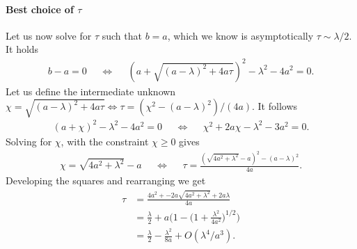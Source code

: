 \documentclass[11pt]{article}
\begin{document}
\paragraph{Best choice of $\tau$} Let us now solve for $\tau$ such that $b=a$, which we know is asymptotically $\tau\sim \lambda/2$. It holds
\begin{align*}
b-a = 0 &&\Leftrightarrow && (a+\sqrt{(a-\lambda)^2+4a\tau})^2-\lambda^2 -4a^2 = 0.
\end{align*} 
Let us define the intermediate unknown $\chi = \sqrt{(a-\lambda)^2+4a\tau} \Leftrightarrow \tau = (\chi^2-(a-\lambda)^2)/(4a)$. It follows
\begin{align*}
(a+\chi)^2-\lambda^2-4a^2 =0 && \Leftrightarrow &&  \chi^2 +2a\chi -\lambda^2-3a^2=0.
\end{align*} 
Solving for $\chi$, with the constraint $\chi\geq 0$ gives
\begin{align*}
\chi=\sqrt{4a^2+\lambda^2}-a&& \Leftrightarrow && \tau = \frac{(\sqrt{4a^2+\lambda^2}-a)^2-(a-\lambda)^2}{4a}.
\end{align*} 
Developing the squares and rearranging we get
\begin{align*}
\tau &= \frac{4a^2+-2a\sqrt{4a^2+\lambda^2}+2a\lambda}{4a} \\
&= \frac{\lambda}{2} + a\Big(1-\Big(1+\frac{\lambda^2}{4a^2}\Big)^{1/2}\Big)\\
&=\frac{\lambda}{2} -\frac{\lambda^2}{8a} +O(\lambda^4/a^3).
\end{align*}
\end{document}

